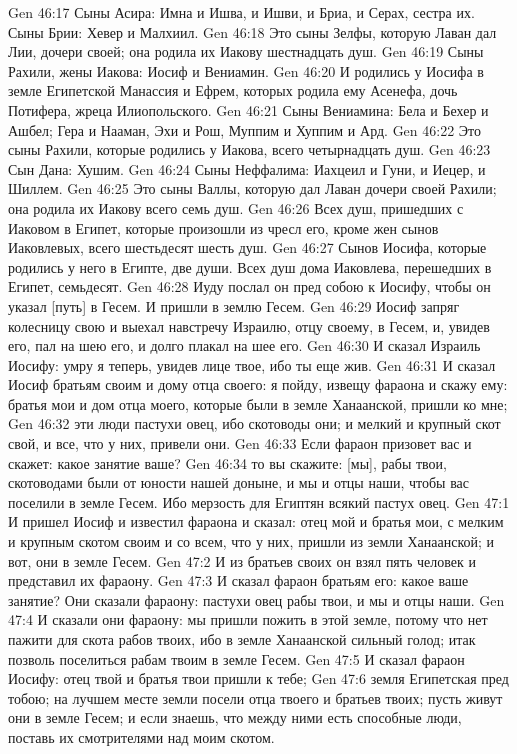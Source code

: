 Gen 46:17  Сыны Асира: Имна и Ишва, и Ишви, и Бриа, и Серах, сестра их. Сыны Брии: Хевер и Малхиил.
Gen 46:18  Это сыны Зелфы, которую Лаван дал Лии, дочери своей; она родила их Иакову шестнадцать душ.
Gen 46:19  Сыны Рахили, жены Иакова: Иосиф и Вениамин.
Gen 46:20  И родились у Иосифа в земле Египетской Манассия и Ефрем, которых родила ему Асенефа, дочь Потифера, жреца Илиопольского.
Gen 46:21  Сыны Вениамина: Бела и Бехер и Ашбел; Гера и Нааман, Эхи и Рош, Муппим и Хуппим и Ард.
Gen 46:22  Это сыны Рахили, которые родились у Иакова, всего четырнадцать душ.
Gen 46:23  Сын Дана: Хушим.
Gen 46:24  Сыны Неффалима: Иахцеил и Гуни, и Иецер, и Шиллем.
Gen 46:25  Это сыны Валлы, которую дал Лаван дочери своей Рахили; она родила их Иакову всего семь душ.
Gen 46:26  Всех душ, пришедших с Иаковом в Египет, которые произошли из чресл его, кроме жен сынов Иаковлевых, всего шестьдесят шесть душ.
Gen 46:27  Сынов Иосифа, которые родились у него в Египте, две души. Всех душ дома Иаковлева, перешедших в Египет, семьдесят.
Gen 46:28  Иуду послал он пред собою к Иосифу, чтобы он указал [путь] в Гесем. И пришли в землю Гесем.
Gen 46:29  Иосиф запряг колесницу свою и выехал навстречу Израилю, отцу своему, в Гесем, и, увидев его, пал на шею его, и долго плакал на шее его.
Gen 46:30  И сказал Израиль Иосифу: умру я теперь, увидев лице твое, ибо ты еще жив.
Gen 46:31  И сказал Иосиф братьям своим и дому отца своего: я пойду, извещу фараона и скажу ему: братья мои и дом отца моего, которые были в земле Ханаанской, пришли ко мне;
Gen 46:32  эти люди пастухи овец, ибо скотоводы они; и мелкий и крупный скот свой, и все, что у них, привели они.
Gen 46:33  Если фараон призовет вас и скажет: какое занятие ваше?
Gen 46:34  то вы скажите: [мы], рабы твои, скотоводами были от юности нашей доныне, и мы и отцы наши, чтобы вас поселили в земле Гесем. Ибо мерзость для Египтян всякий пастух овец.
Gen 47:1  И пришел Иосиф и известил фараона и сказал: отец мой и братья мои, с мелким и крупным скотом своим и со всем, что у них, пришли из земли Ханаанской; и вот, они в земле Гесем.
Gen 47:2  И из братьев своих он взял пять человек и представил их фараону.
Gen 47:3  И сказал фараон братьям его: какое ваше занятие? Они сказали фараону: пастухи овец рабы твои, и мы и отцы наши.
Gen 47:4  И сказали они фараону: мы пришли пожить в этой земле, потому что нет пажити для скота рабов твоих, ибо в земле Ханаанской сильный голод; итак позволь поселиться рабам твоим в земле Гесем.
Gen 47:5  И сказал фараон Иосифу: отец твой и братья твои пришли к тебе;
Gen 47:6  земля Египетская пред тобою; на лучшем месте земли посели отца твоего и братьев твоих; пусть живут они в земле Гесем; и если знаешь, что между ними есть способные люди, поставь их смотрителями над моим скотом.
